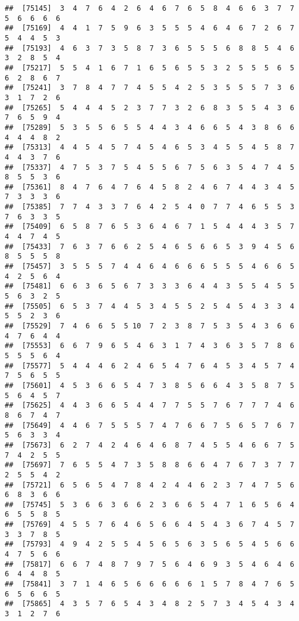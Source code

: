 \documentclass[
]{book}
\begin{document}
\begin{verbatim}
##  [75145]  3  4  7  6  4  2  6  4  6  7  6  5  8  4  6  6  3  7  7  5  6  6  6  6
##  [75169]  4  4  1  7  5  9  6  3  5  5  5  4  6  4  6  7  2  6  7  5  4  4  5  3
##  [75193]  4  6  3  7  3  5  8  7  3  6  5  5  5  6  8  8  5  4  6  3  2  8  5  4
##  [75217]  5  5  4  1  6  7  1  6  5  6  5  5  3  2  5  5  5  6  5  6  2  8  6  7
##  [75241]  3  7  8  4  7  7  4  5  5  4  2  5  3  5  5  5  7  3  6  3  1  7  2  6
##  [75265]  5  4  4  4  5  2  3  7  7  3  2  6  8  3  5  5  4  3  6  7  6  5  9  4
##  [75289]  5  3  5  5  6  5  5  4  4  3  4  6  6  5  4  3  8  6  6  4  4  4  8  2
##  [75313]  4  4  5  4  5  7  4  5  4  6  5  3  4  5  5  4  5  8  7  4  4  3  7  6
##  [75337]  4  7  5  3  7  5  4  5  5  6  7  5  6  3  5  4  7  4  5  8  5  5  3  6
##  [75361]  8  4  7  6  4  7  6  4  5  8  2  4  6  7  4  4  3  4  5  7  3  3  3  6
##  [75385]  7  7  4  3  3  7  6  4  2  5  4  0  7  7  4  6  5  5  3  7  6  3  3  5
##  [75409]  6  5  8  7  6  5  3  6  4  6  7  1  5  4  4  4  3  5  7  4  4  7  4  5
##  [75433]  7  6  3  7  6  6  2  5  4  6  5  6  6  5  3  9  4  5  6  8  5  5  5  8
##  [75457]  3  5  5  5  7  4  4  6  4  6  6  6  5  5  5  4  6  6  5  4  2  5  6  4
##  [75481]  6  6  3  6  5  6  7  3  3  3  6  4  4  3  5  5  4  5  5  5  6  3  2  5
##  [75505]  6  5  3  7  4  4  5  3  4  5  5  2  5  4  5  4  3  3  4  5  5  2  3  6
##  [75529]  7  4  6  6  5  5 10  7  2  3  8  7  5  3  5  4  3  6  6  4  7  6  4  4
##  [75553]  6  6  7  9  6  5  4  6  3  1  7  4  3  6  3  5  7  8  6  5  5  5  6  4
##  [75577]  5  4  4  4  6  2  4  6  5  4  7  6  4  5  3  4  5  7  4  7  5  6  5  5
##  [75601]  4  5  3  6  6  5  4  7  3  8  5  6  6  4  3  5  8  7  5  5  6  4  5  7
##  [75625]  4  4  3  6  6  5  4  4  7  7  5  5  7  6  7  7  7  4  6  8  6  7  4  7
##  [75649]  4  4  6  7  5  5  5  7  4  7  6  6  7  5  6  5  7  6  7  5  6  3  3  4
##  [75673]  6  2  7  4  2  4  6  4  6  8  7  4  5  5  4  6  6  7  5  7  4  2  5  5
##  [75697]  7  6  5  5  4  7  3  5  8  8  6  6  4  7  6  7  3  7  7  2  5  5  4  2
##  [75721]  6  5  6  5  4  7  8  4  2  4  4  6  2  3  7  4  7  5  6  6  8  3  6  6
##  [75745]  5  3  6  6  3  6  6  2  3  6  6  5  4  7  1  6  5  6  4  6  5  5  8  5
##  [75769]  4  5  5  7  6  4  6  5  6  6  4  5  4  3  6  7  4  5  7  3  3  7  8  5
##  [75793]  4  9  4  2  5  5  4  5  6  5  6  3  5  6  5  4  5  6  6  4  7  5  6  6
##  [75817]  6  6  7  4  8  7  9  7  5  6  4  6  9  3  5  4  6  4  6  6  4  4  8  5
##  [75841]  3  7  1  4  6  5  6  6  6  6  6  1  5  7  8  4  7  6  5  6  5  6  6  5
##  [75865]  4  3  5  7  6  5  4  3  4  8  2  5  7  3  4  5  4  3  4  3  1  2  7  6

\end{verbatim}
\end{document}
